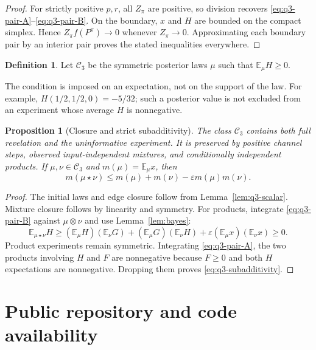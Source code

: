 \documentclass[11pt,reqno]{amsart}
\newtheorem{proposition}[theorem]{Proposition}
\theoremstyle{definition}
\newtheorem{definition}[theorem]{Definition}
\theoremstyle{remark}
\newcommand{\E}{\mathbb E}
\newcommand{\eps}{\varepsilon}
\newcommand{\cC}{\mathcal C}
\begin{document}
\begin{proof}
For strictly positive $p,r$, all $Z_\pi$ are positive, so division recovers \eqref{eq:q3-pair-A}--\eqref{eq:q3-pair-B}. On the boundary, $x$ and $H$ are bounded on the compact simplex. Hence $Z_\pi f(P^\pi)\to0$ whenever $Z_\pi\to0$. Approximating each boundary pair by an interior pair proves the stated inequalities everywhere.
\end{proof}

\begin{definition}
Let $\cC_3$ be the symmetric posterior laws $\mu$ such that $\E_\mu H\ge0$.
\end{definition}

The condition is imposed on an expectation, not on the support of the law. For example, $H(1/2,1/2,0)=-5/32$; such a posterior value is not excluded from an experiment whose average $H$ is nonnegative.

\begin{proposition}[Closure and strict subadditivity]\label{prop:q3-cone}
The class $\cC_3$ contains both full revelation and the uninformative experiment. It is preserved by positive channel steps, observed input-independent mixtures, and conditionally independent products. If $\mu,\nu\in\cC_3$ and $m(\mu)=\E_\mu x$, then
\begin{equation}\label{eq:q3-subadditivity}
 m(\mu\star\nu)\le m(\mu)+m(\nu)-\eps m(\mu)m(\nu).
\end{equation}
\end{proposition}

\begin{proof}
The initial laws and edge closure follow from Lemma~\ref{lem:q3-scalar}. Mixture closure follows by linearity and symmetry. For products, integrate \eqref{eq:q3-pair-B} against $\mu\otimes\nu$ and use Lemma~\ref{lem:bayes}:
\[
 \E_{\mu\star\nu}H\ge
 (\E_\mu H)(\E_\nu G)+(\E_\mu G)(\E_\nu H)
 +\eps (\E_\mu x)(\E_\nu x)\ge0.
\]
Product experiments remain symmetric. Integrating \eqref{eq:q3-pair-A}, the two products involving $H$ and $F$ are nonnegative because $F\ge0$ and both $H$ expectations are nonnegative. Dropping them proves \eqref{eq:q3-subadditivity}.
\end{proof}





\appendix


\section*{Public repository and code availability}
\end{document}
